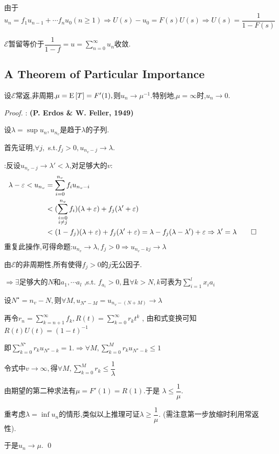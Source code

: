 由于 $ u_n = f_1u_{n-1}+\cdots f_nu_0 (n\ge 1)\Rightarrow U(s)-u_0 = F(s)U(s)\Rightarrow U(s)=\dfrac{1}{1-F(s)}$

$ \mathcal{E}$暂留等价于$ \dfrac{1}{1-f} = u=\sum_{n=0}^\infty u_n$收敛.


\subsection{A Theorem of Particular Importance}
  设$ \mathcal{E}$常返,非周期.$ \mu = \text{E}\left[T\right] = F'(1),$则$ u_n\to \mu^{-1}$.特别地,$ \mu=\infty$时,$ u_n\to 0$.

\begin{proof}:
  \textbf{(P. Erdos \& W. Feller, 1949)}

  设$\lambda=\sup u_n,u_{n_v}$是趋于$ \lambda$的子列.

  首先证明,$ \forall j, $ s.t.$ f_j>0,u_{n_v-j}\to \lambda$.

  \proof:反设$ u_{n_v-j}\to \lambda'<\lambda$,对足够大的$ v$:
\begin{align*}
  \lambda-\varepsilon < u_{n_v} &=\sum_{i=0}^{n_v}f_iu_{n_v-i}\\
     &<(\sum_{\substack{i=0\\i\neq j}}^{n_v}f_i)(\lambda + \varepsilon) + f_j(\lambda' + \varepsilon)\\
     &<(1-f_j)(\lambda+\varepsilon) + f_j(\lambda' + \varepsilon)
     =\lambda-f_j(\lambda-\lambda') +\varepsilon \Rightarrow \lambda' = \lambda \qed
\end{align*}
重复此操作,可得命题:$u_{n_v}\to \lambda, f_j>0\Rightarrow  u_{n_v-kj}\to \lambda$

由$ \mathcal{E}$的非周期性,所有使得$ f_j>0$的$ j$无公因子.

$\Rightarrow  \exists 足够大的N 和 a_1,\cdots a_l$ ,s.t. $f_{a_i}>0,且 \forall k >N, k 可表为 \sum_{i=1}^l{x_ia_i} $

设$ N^\star = n_v-N,$则$ \forall M, u_{N^\star - M} = u_{n_v - (N+M)}\to \lambda$

再令$ r_n = \sum_{k=n+1}^\infty f_k, R(t) = \sum_{k=0}^{\infty}r_kt^k$ , 由和式变换可知$ R(t)U(t) = (1-t)^{-1}$

即$ \sum_{k=0}^{N^\star}{r_ku_{N^\star - k}} = 1.\Rightarrow  \forall M, \sum_{k=0}^M{r_ku_{N^\star - k}}\le 1$

令式中$v\to \infty , $得$\forall M, \sum_{k=0}^M{r_k} \le \dfrac{1}{\lambda} $

由期望的第二种求法有$ \mu = F'(1) = R(1). $于是 $\lambda \le \dfrac{1}{\mu}$.

重考虑$ \lambda=\inf u_n$的情形,类似以上推理可证$ \lambda \ge \dfrac{1}{\mu}$. (需注意第一步放缩时利用常返性).

于是$ u_n\to \mu$. \qed
\end{proof}


